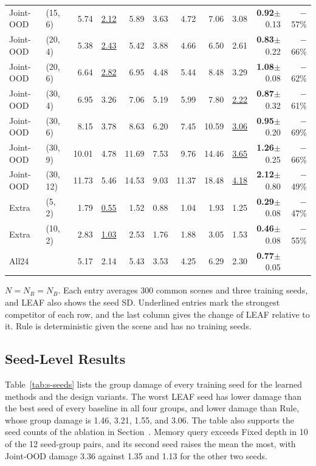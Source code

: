 \begin{table}[!t]
\begin{tabular}{@{}llrrrrrrrrr@{}}
Joint-OOD & (15, 6) & 5.74 & \underline{2.12} & 5.89 & 3.63 & 4.72 & 7.06 & 3.08 & \textbf{0.92}$\pm$0.13 & $-$57\%\\
Joint-OOD & (20, 4) & 5.38 & \underline{2.43} & 5.42 & 3.88 & 4.66 & 6.50 & 2.61 & \textbf{0.83}$\pm$0.22 & $-$66\%\\
Joint-OOD & (20, 6) & 6.64 & \underline{2.82} & 6.95 & 4.48 & 5.44 & 8.48 & 3.29 & \textbf{1.08}$\pm$0.08 & $-$62\%\\
Joint-OOD & (30, 4) & 6.95 & 3.26 & 7.06 & 5.19 & 5.99 & 7.80 & \underline{2.22} & \textbf{0.87}$\pm$0.32 & $-$61\%\\
Joint-OOD & (30, 6) & 8.15 & 3.78 & 8.63 & 6.20 & 7.45 & 10.59 & \underline{3.06} & \textbf{0.95}$\pm$0.20 & $-$69\%\\
Joint-OOD & (30, 9) & 10.01 & 4.78 & 11.69 & 7.53 & 9.76 & 14.46 & \underline{3.65} & \textbf{1.26}$\pm$0.25 & $-$66\%\\
Joint-OOD & (30, 12) & 11.73 & 5.46 & 14.53 & 9.03 & 11.37 & 18.48 & \underline{4.18} & \textbf{2.12}$\pm$0.80 & $-$49\%\\
Extra & (5, 2) & 1.79 & \underline{0.55} & 1.52 & 0.88 & 1.04 & 1.93 & 1.25 & \textbf{0.29}$\pm$0.08 & $-$47\%\\
Extra & (10, 2) & 2.83 & \underline{1.03} & 2.53 & 1.76 & 1.88 & 3.05 & 1.53 & \textbf{0.46}$\pm$0.08 & $-$55\%\\
\midrule
All24 & & 5.17 & 2.14 & 5.43 & 3.53 & 4.25 & 6.29 & 2.30 & \textbf{0.77}$\pm$0.05 & \\
\bottomrule
\end{tabular}
\par\smallskip
\parbox{\textwidth}{\scriptsize $N=N_R=N_B$. Each entry averages 300 common scenes and three training seeds, and LEAF also shows the seed SD. Underlined entries mark the strongest competitor of each row, and the last column gives the change of LEAF relative to it. Rule is deterministic given the scene and has no training seeds.}
\end{table}

\subsection{Seed-Level Results}
Table~\ref{tab:s-seeds} lists the group damage of every training seed for the learned methods and the design variants. The worst LEAF seed has lower damage than the best seed of every baseline in all four groups, and lower damage than Rule, whose group damage is 1.46, 3.21, 1.55, and 3.06. The table also supports the seed counts of the ablation in Section~. Memory query exceeds Fixed depth in 10 of the 12 seed-group pairs, and its second seed raises the mean the most, with Joint-OOD damage 3.36 against 1.35 and 1.13 for the other two seeds.

